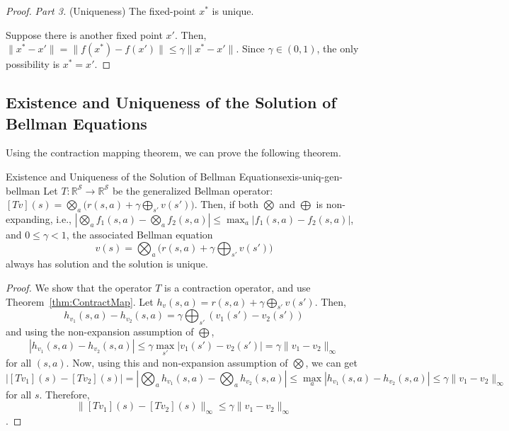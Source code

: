 \begin{proof}
            \textit{Part 3.} (Uniqueness) The fixed-point $x^*$ is unique.

            Suppose there is another fixed point $x'$. Then, $\|x^*-x'\| = \|f(x^*)-f(x')\| \leq \gamma \|x^*-x'\|$. Since $\gamma \in (0,1)$, the only possibility is $x^*=x'$.


        \end{proof}

    \subsection{Existence and Uniqueness of the Solution of Bellman Equations}\label{sec:SolveBellmanOptEq}
        Using the contraction mapping theorem, we can prove the following theorem.

        \begin{thm}{Existence and Uniqueness of the Solution of Bellman Equations}{exis-uniq-gen-bellman}
            Let $T:\mathbb{R}^\mathcal{S} \to \mathbb{R}^\mathcal{S}$ be the generalized Bellman operator: $[Tv](s) = \bigotimes_a \Big( r(s,a) + \gamma \bigoplus_{s'}v(s') \Big)$.
            Then, if both $\bigotimes$ and $\bigoplus$ is non-expanding, i.e.,
            $\left|\bigotimes_a f_1(s,a) - \bigotimes_a f_2(s,a)\right| \leq \max_a |f_1(s,a) - f_2(s,a)|$, and $0 \leq \gamma < 1$, the associated Bellman equation
            \begin{equation}
                v(s) = \bigotimes_a \Big(r(s, a) + \gamma \bigoplus_{s'} v(s') \Big) 
            \end{equation} 
            always has solution and the solution is unique.
        \end{thm}
        \begin{proof}
            We show that the operator $T$ is a contraction operator, and use Theorem~\ref{thm:ContractMap}.
            Let $h_v(s,a) = r(s,a) + \gamma \bigoplus_{s'} v(s')$. Then,
            \begin{equation}
                h_{v_1}(s,a) - h_{v_2}(s,a) = \gamma \bigoplus_{s'} \left( v_1(s') - v_2(s') \right)
            \end{equation}
            and using the non-expansion assumption of $\bigoplus$,
            \begin{equation}
                |h_{v_1}(s,a) - h_{v_2}(s,a)| \leq \gamma \max_{s'}|v_1(s') - v_2(s')| = \gamma \|v_1 - v_2\|_\infty
            \end{equation}
            for all $(s, a)$.
            Now, using this and non-expansion assumption of $\bigotimes$, we can get
            \begin{equation}
                |[Tv_1](s) - [Tv_2](s)| = |\bigotimes_a h_{v_1}(s,a) - \bigotimes_a h_{v_2}(s, a)| \leq \max_a |h_{v_1}(s,a) - h_{v_2}(s,a)| \leq \gamma \|v_1 - v_2\|_\infty
            \end{equation}
            for all $s$. Therefore,
            \begin{equation}
                \|[Tv_1](s) - [Tv_2](s)\|_\infty \leq \gamma \|v_1 - v_2\|_\infty
            \end{equation}.
        \end{proof}

